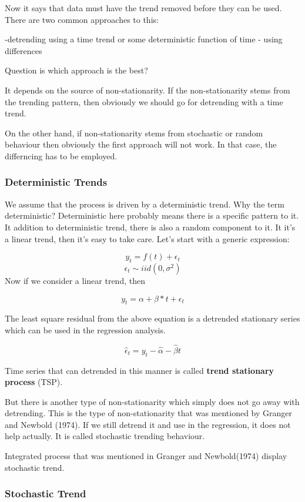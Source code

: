\documentclass{book}
\begin{document}
Now it says that data must have the trend removed before they can be used. There are two common approaches to this:

-detrending using a time trend or some deterministic function of time
- using differences

Question is which approach is the best?

It depends on the source of non-stationarity. If the non-stationarity stems from the trending pattern, then obviously we should go for detrending with a time trend.

On the other hand, if non-stationarity stems from stochastic or random behaviour then obviously the first approach will not work. In that case, the differncing has to be employed. 

\subsubsection{Deterministic Trends}
We assume that the process is driven by a deterministic trend. Why the term deterministic?  Deterministic here probably means there is a specific pattern to it. It addition to deterministic trend, there is also a random component to it. It it's a linear trend, then it's easy to take care. Let's start with a generic expression:

$$y_t=f(t)+ \epsilon_t $$
$$ \epsilon_t \sim iid(0,\sigma^2)$$
Now if we consider a linear trend, then

$$y_t= \alpha+\beta* t+ \epsilon_t $$

The least square residual from the above equation is a detrended stationary series which can be used in the regression analysis. 

$$\hat{\epsilon}_t=y_t-\hat{\alpha}-\hat{\beta}t$$

Time series that can detrended in this manner is called \textbf{trend stationary process} (TSP). 

But there is another type of non-stationarity which simply does not go away with detrending. This is the type of non-stationarity that was mentioned by Granger and Newbold (1974). If we still detrend it and use in the regression, it does not help actually. It is called stochastic  trending behaviour. 

Integrated process that was mentioned in Granger and Newbold(1974) display stochastic trend. 

\subsubsection*{Stochastic Trend}
\end{document}
